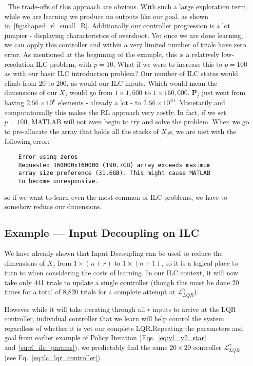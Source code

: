 \FloatBarrier~The trade-offs of this approach are obvious. With such a large exploration term, while we are learning we produce no outputs like our goal, as shown in~\ref{fig:shaped_rl_small_R}. Additionally our controller progression is a lot jumpier - displaying characteristics of overshoot. Yet once we are done learning, we can apply this controller and within a very limited number of trials have zero error.
As mentioned at the beginning of the example, this is a relatively low-resolution ILC problem, with $p=10$. What if we were to increase this to $p=100$ as with our basic ILC introduction problem?
Our number of ILC states would climb from 20 to 200, as would our ILC inputs. Which would mean the dimensions of our $X_j$ would go from $1\times1,600$ to $1\times160,000$. $\textbf{P}_j$ just went from having $2.56\times{10}^6$ elements - already a lot - to $2.56\times{10}^{10}$. Monetarily and computationally this makes the RL approach very costly. In fact, if we set $p=100$, MATLAB will not even begin to try and solve the problem. When we go to pre-allocate the array that holds all the stacks of $X_j$s, we are met with the following error:
\begin{center}
    \begin{verbatim}
    Error using zeros
    Requested 160000x160000 (190.7GB) array exceeds maximum 
    array size preference (31.6GB). This might cause MATLAB 
    to become unresponsive.
    \end{verbatim}
\end{center}
so if we want to learn even the most common of ILC problems, we have to somehow reduce our dimensions.

\FloatBarrier\subsection{Example --- Input Decoupling on ILC}
We have already shown that Input Decoupling can be used to reduce the dimensions of $X_j$ from $1\times\left(n+r\right)$ to $1\times\left(n+1\right)$, so it is a logical place to turn to when considering the costs of learning. In our ILC context, it will now take only 441 trials to update a single controller (though this must be done 20 times for a total of 8,820 trials for a complete attempt at $\mathcal{L}_{LQR}^\gamma$).

However while it will take iterating through all $r$ inputs to arrive at the LQR controller, individual controller that we learn will help control the system regardless of whether it is yet our complete LQR.\@ Repeating the parameters and goal from earlier example of Policy Iteration (Eqs.~\ref{eq:y1_y2_star} and~\ref{eq:rl_ilc_params}), we predictably find the same $20 \times20$ controller $\mathcal{L}_{LQR}^\gamma$ (see Eq.~\ref{eq:ilc_lqr_controller}).

